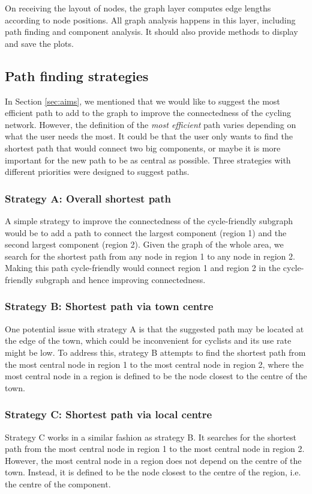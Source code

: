 \documentclass[12pt,a4paper]{report}
\begin{document}
On receiving the layout of nodes, the graph layer computes edge lengths according to node positions. All graph analysis happens in this layer, including path finding and component analysis. It should also provide methods to display and save the plots.

\subsection{Path finding strategies} \label{sec:strategies}
In Section \ref{sec:aims}, we mentioned that we would like to suggest the most efficient path to add to the graph to improve the connectedness of the cycling network. However, the definition of the \textit{most efficient} path varies depending on what the user needs the most. It could be that the user only wants to find the shortest path that would connect two big components, or maybe it is more important for the new path to be as central as possible. Three strategies with different priorities were designed to suggest paths.

\subsubsection*{Strategy A: Overall shortest path}
A simple strategy to improve the connectedness of the cycle-friendly subgraph would be to add a path to connect the largest component (region 1) and the second largest component (region 2). Given the graph of the whole area, we search for the shortest path from any node in region 1 to any node in region 2. Making this path cycle-friendly would connect region 1 and region 2 in the cycle-friendly subgraph and hence improving connectedness.

\subsubsection*{Strategy B: Shortest path via town centre}
One potential issue with strategy A is that the suggested path may be located at the edge of the town, which could be inconvenient for cyclists and its use rate might be low. To address this, strategy B attempts to find the shortest path from the most central node in region 1 to the most central node in region 2, where the most central node in a region is defined to be the node closest to the centre of the town.

\subsubsection*{Strategy C: Shortest path via local centre}
Strategy C works in a similar fashion as strategy B. It searches for the shortest path from the most central node in region 1 to the most central node in region 2. However, the most central node in a region does not depend on the centre of the town. Instead, it is defined to be the node closest to the centre of the region, i.e. the centre of the component.
\end{document}
